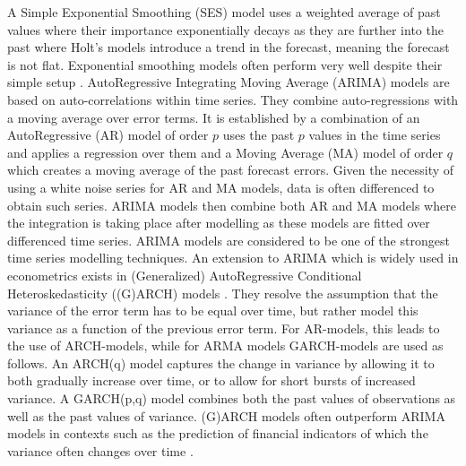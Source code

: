 A Simple Exponential Smoothing (SES) model uses a weighted average of past values where their importance exponentially decays as they are further into the past where Holt's models introduce a trend in the forecast, meaning the forecast is not flat.
Exponential smoothing models often perform very well despite their simple setup \cite{makridakis2018statistical}.
AutoRegressive Integrating Moving Average (ARIMA) models are based on auto-correlations within time series. 
They combine auto-regressions with a moving average over error terms.
It is established by a combination of an AutoRegressive (AR) model of order $p$ uses the past $p$ values in the time series and applies a regression over them and a Moving Average (MA) model of order $q$ which creates a moving average of the past forecast errors.
Given the necessity of using a white noise series for AR and MA models, data is often differenced to obtain such series.
ARIMA models then combine both AR and MA models where the integration is taking place after modelling as these models are fitted over differenced time series.
ARIMA models are considered to be one of the strongest time series modelling techniques.
An extension to ARIMA which is widely used in econometrics exists in (Generalized) AutoRegressive Conditional Heteroskedasticity ((G)ARCH) models \cite{francq2019garch}.
They resolve the assumption that the variance of the error term has to be equal over time, but rather model this variance as a function of the previous error term.
For AR-models, this leads to the use of ARCH-models, while for ARMA models GARCH-models are used as follows.
An ARCH(q) model captures the change in variance by allowing it to both gradually increase over time, or to allow for short bursts of increased variance.
A GARCH(p,q) model combines both the past values of observations as well as the past values of variance.
(G)ARCH models often outperform ARIMA models in contexts such as the prediction of financial indicators of which the variance often changes over time \cite{francq2019garch}.








